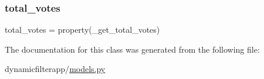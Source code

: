 \subsubsection{\texorpdfstring{total\+\_\+votes}{total\_votes}}
{\footnotesize\ttfamily total\+\_\+votes = property(\+\_\+get\+\_\+total\+\_\+votes)\hspace{0.3cm}{\ttfamily [static]}}



The documentation for this class was generated from the following file\+:\begin{DoxyCompactItemize}
\item 
dynamicfilterapp/\mbox{\hyperlink{models_8py}{models.\+py}}\end{DoxyCompactItemize}
